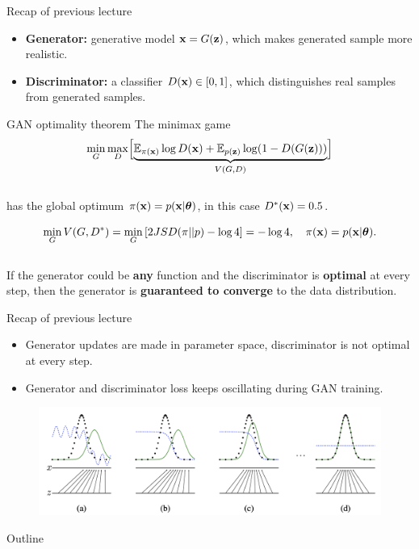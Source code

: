 \begin{frame}{Recap of previous lecture}
	\begin{itemize}
		\item \textbf{Generator:} generative model $\mathbf{x} = G(\mathbf{z})$, which makes generated sample more realistic.
		\item \textbf{Discriminator:} a classifier $D(\mathbf{x}) \in [0, 1]$, which distinguishes real samples from generated samples.
	\end{itemize}
	\vspace{-0.1cm}
	\begin{block}{GAN optimality theorem}
		The minimax game 
		\vspace{-0.3cm}
		\[
		\min_{G} \max_D \Bigl[ \underbrace{\mathbb{E}_{\pi(\mathbf{x})} \log D(\mathbf{x}) + \mathbb{E}_{p(\mathbf{z})} \log (1 - D(G(\mathbf{z})))}_{V(G, D)} \Bigr]
		\]
		\vspace{-0.5cm} \\
		has the global optimum $\pi(\mathbf{x}) = p(\mathbf{x} | \boldsymbol{\theta})$, in this case $D^*(\mathbf{x}) = 0.5$.
	\end{block}
	\[
		\min_{G} V(G, D^*) = \min_{G} \left[ 2 JSD(\pi || p) - \log 4 \right] = -\log 4, \quad \pi(\mathbf{x}) = p(\mathbf{x} | \boldsymbol{\theta}).
	\]
	\vspace{-0.5cm} \\
	If the generator could be \textbf{any} function and the discriminator is \textbf{optimal} at every step, then the generator is \textbf{guaranteed to converge} to the data distribution.
\end{frame}
\begin{frame}{Recap of previous lecture}
	\begin{itemize}
		\item Generator updates are made in parameter space, discriminator is not optimal at every step.
		\item Generator and discriminator loss keeps oscillating during GAN training.
	\end{itemize}
	\vspace{-0.3cm}
	\begin{figure}
		\centering
		\includegraphics[width=1.0\linewidth]{figs/gan_1}
	\end{figure}
\end{frame}
\begin{frame}{Outline}
	\tableofcontents
\end{frame}
